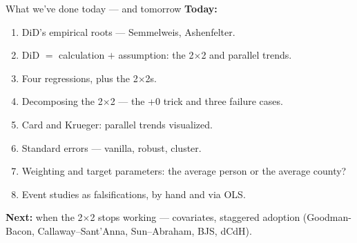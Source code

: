 \documentclass[aspectratio=169,11pt]{beamer}
\begin{document}
\begin{frame}{What we've done today --- and tomorrow}
\vspace{0.3em}
\textbf{Today:}
\begin{enumerate}\small
  \item DiD's empirical roots --- Semmelweis, Ashenfelter.
  \item DiD $=$ calculation $+$ assumption: the 2$\times$2 and parallel trends.
  \item Four regressions, plus the 2$\times$2s.
  \item Decomposing the 2$\times$2 --- the +0 trick and three failure cases.
  \item Card and Krueger: parallel trends visualized.
  \item Standard errors --- vanilla, robust, cluster.
  \item Weighting and target parameters: the average person or the average county?
  \item Event studies as falsifications, by hand and via OLS.
\end{enumerate}
\vspace{0.5em}
\textbf{Next:} when the 2$\times$2 stops working --- covariates, staggered adoption (Goodman-Bacon, Callaway--Sant'Anna, Sun--Abraham, BJS, dCdH).
\end{frame}
\end{document}
